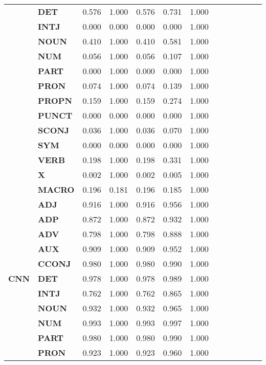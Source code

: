 \begin{longtable}{|l||l||l||l||l||l||l||l||l||l||l||l||l|}
\textbf{} & \textbf{DET} & 0.576 & 1.000 & 0.576 & 0.731 & 1.000 \\
\textbf{} & \textbf{INTJ} & 0.000 & 0.000 & 0.000 & 0.000 & 1.000 \\
\textbf{} & \textbf{NOUN} & 0.410 & 1.000 & 0.410 & 0.581 & 1.000 \\
\textbf{} & \textbf{NUM} & 0.056 & 1.000 & 0.056 & 0.107 & 1.000 \\
\textbf{} & \textbf{PART} & 0.000 & 1.000 & 0.000 & 0.000 & 1.000 \\
\textbf{} & \textbf{PRON} & 0.074 & 1.000 & 0.074 & 0.139 & 1.000 \\
\textbf{} & \textbf{PROPN} & 0.159 & 1.000 & 0.159 & 0.274 & 1.000 \\
\textbf{} & \textbf{PUNCT} & 0.000 & 0.000 & 0.000 & 0.000 & 1.000 \\
\textbf{} & \textbf{SCONJ} & 0.036 & 1.000 & 0.036 & 0.070 & 1.000 \\
\textbf{} & \textbf{SYM} & 0.000 & 0.000 & 0.000 & 0.000 & 1.000 \\
\textbf{} & \textbf{VERB} & 0.198 & 1.000 & 0.198 & 0.331 & 1.000 \\
\textbf{} & \textbf{X} & 0.002 & 1.000 & 0.002 & 0.005 & 1.000 \\
\textbf{} & \textbf{MACRO} & 0.196 & 0.181 & 0.196 & 0.185 & 1.000 \\
\cline{1-7}
\multirow[t]{18}{*}{\textbf{CNN}} & \textbf{ADJ} & 0.916 & 1.000 & 0.916 & 0.956 & 1.000 \\
\textbf{} & \textbf{ADP} & 0.872 & 1.000 & 0.872 & 0.932 & 1.000 \\
\textbf{} & \textbf{ADV} & 0.798 & 1.000 & 0.798 & 0.888 & 1.000 \\
\textbf{} & \textbf{AUX} & 0.909 & 1.000 & 0.909 & 0.952 & 1.000 \\
\textbf{} & \textbf{CCONJ} & 0.980 & 1.000 & 0.980 & 0.990 & 1.000 \\
\textbf{} & \textbf{DET} & 0.978 & 1.000 & 0.978 & 0.989 & 1.000 \\
\textbf{} & \textbf{INTJ} & 0.762 & 1.000 & 0.762 & 0.865 & 1.000 \\
\textbf{} & \textbf{NOUN} & 0.932 & 1.000 & 0.932 & 0.965 & 1.000 \\
\textbf{} & \textbf{NUM} & 0.993 & 1.000 & 0.993 & 0.997 & 1.000 \\
\textbf{} & \textbf{PART} & 0.980 & 1.000 & 0.980 & 0.990 & 1.000 \\
\textbf{} & \textbf{PRON} & 0.923 & 1.000 & 0.923 & 0.960 & 1.000 \\

\end{longtable}
